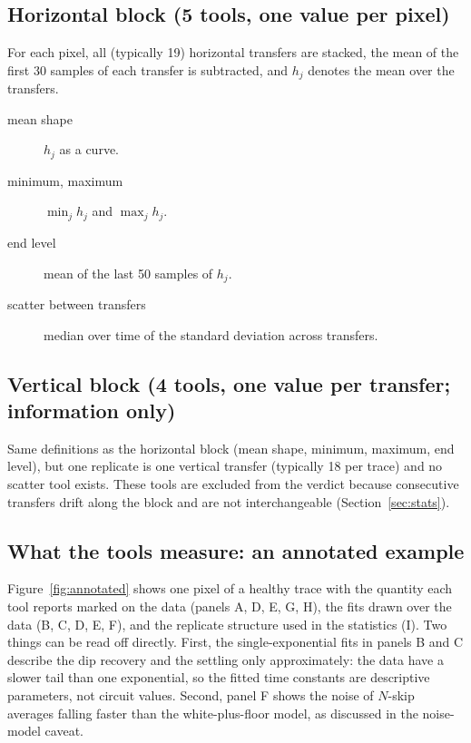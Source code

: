 \documentclass[11pt]{article}
\begin{document}
\subsection{Horizontal block (5 tools, one value per pixel)}

For each pixel, all (typically 19) horizontal transfers are stacked, the mean of the first 30 samples of each
transfer is subtracted, and $h_j$ denotes the mean over the transfers.

\begin{description}
  \item[mean shape] $h_j$ as a curve.
  \item[minimum, maximum] $\min_j h_j$ and $\max_j h_j$.
  \item[end level] mean of the last 50 samples of $h_j$.
  \item[scatter between transfers] median over time of the standard deviation across transfers.
\end{description}

\subsection{Vertical block (4 tools, one value per transfer; information only)}

Same definitions as the horizontal block (mean shape, minimum, maximum, end level), but one replicate is one
vertical transfer (typically 18 per trace) and no scatter tool exists. These tools are excluded from the verdict
because consecutive transfers drift along the block and are not interchangeable (Section~\ref{sec:stats}).

\subsection{What the tools measure: an annotated example}

Figure~\ref{fig:annotated} shows one pixel of a healthy trace with the quantity each tool reports marked on the data
(panels A, D, E, G, H), the fits drawn over the data (B, C, D, E, F), and the replicate structure used in the statistics (I).
Two things can be read off directly. First, the single-exponential fits in panels B and C describe the dip recovery and
the settling only approximately: the data have a slower tail than one exponential, so the fitted time constants are
descriptive parameters, not circuit values. Second, panel F shows the noise of $N$-skip averages falling faster than the
white-plus-floor model, as discussed in the noise-model caveat.
\end{document}
